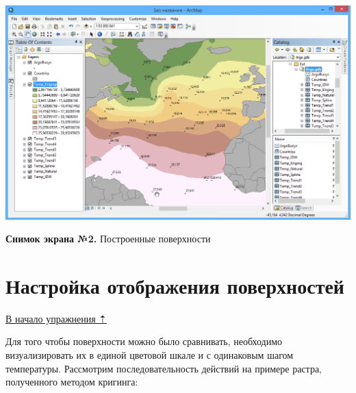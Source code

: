 \documentclass[12pt,]{book}
\begin{document}
\includegraphics{images/Ex17/image9.png}

\textbf{Снимок экрана №2.} Построенные поверхности

\hypertarget{interpolation-visualization}{%
\section{Настройка отображения поверхностей}\label{interpolation-visualization}}

\protect\hyperlink{interpolation}{В начало упражнения ⇡}

Для того чтобы поверхности можно было сравнивать, необходимо визуализировать их в единой цветовой шкале и с одинаковым шагом температуры. Рассмотрим последовательность действий на примере растра, полученного методом кригинга:
\end{document}
